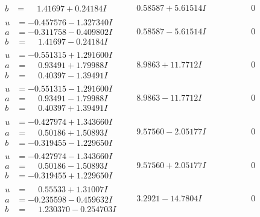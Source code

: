 \documentclass[1p]{elsarticle_modified}
\theoremstyle{definition}
\begin{document}
$$\begin{array}{c|c|c}
\begin{aligned}
b &= \phantom{-}1.41697 + 0.24184 I\end{aligned}
 & \phantom{-}0.58587 + 5.61514 I & \phantom{-0.000000 } 0 \\ \hline\begin{aligned}
u &= -0.457576 - 1.327340 I \\
a &= -0.311758 - 0.409802 I \\
b &= \phantom{-}1.41697 - 0.24184 I\end{aligned}
 & \phantom{-}0.58587 - 5.61514 I & \phantom{-0.000000 } 0 \\ \hline\begin{aligned}
u &= -0.551315 + 1.291600 I \\
a &= \phantom{-}0.93491 + 1.79988 I \\
b &= \phantom{-}0.40397 - 1.39491 I\end{aligned}
 & \phantom{-}8.9863 + 11.7712 I & \phantom{-0.000000 } 0 \\ \hline\begin{aligned}
u &= -0.551315 - 1.291600 I \\
a &= \phantom{-}0.93491 - 1.79988 I \\
b &= \phantom{-}0.40397 + 1.39491 I\end{aligned}
 & \phantom{-}8.9863 - 11.7712 I & \phantom{-0.000000 } 0 \\ \hline\begin{aligned}
u &= -0.427974 + 1.343660 I \\
a &= \phantom{-}0.50186 + 1.50893 I \\
b &= -0.319455 - 1.229650 I\end{aligned}
 & \phantom{-}9.57560 - 2.05177 I & \phantom{-0.000000 } 0 \\ \hline\begin{aligned}
u &= -0.427974 - 1.343660 I \\
a &= \phantom{-}0.50186 - 1.50893 I \\
b &= -0.319455 + 1.229650 I\end{aligned}
 & \phantom{-}9.57560 + 2.05177 I & \phantom{-0.000000 } 0 \\ \hline\begin{aligned}
u &= \phantom{-}0.55533 + 1.31007 I \\
a &= -0.235598 - 0.459632 I \\
b &= \phantom{-}1.230370 - 0.254703 I\end{aligned}
 & \phantom{-}3.2921 - 14.7804 I & \phantom{-0.000000 } 0 \\ \hline\begin{aligned}

\end{aligned}
\end{array}$$
\end{document}
